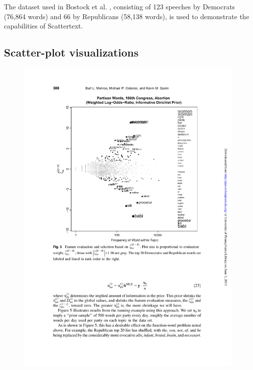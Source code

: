\documentclass[11pt]{article}
\begin{document}
The dataset used in Bostock et al. , consisting of 123 speeches by Democrats (76,864 words) and 66 by Republicans (58,138 words), is used to demonstrate the capabilities of Scattertext.  

\subsection{Scatter-plot visualizations}

\begin{figure}[h]
\includegraphics[width=\columnwidth]{monroefull}

\end{figure}
\end{document}
